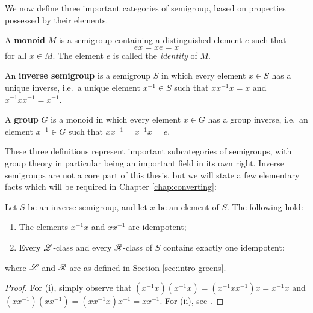 We now define three important categories of semigroup, based on properties
possessed by their elements.

\begin{definition}
  \label{def:monoid}
  A \textbf{monoid} $M$ is a semigroup containing a distinguished element $e$
  such that
  $$ex = xe = x$$
  for all $x \in M$.  The element $e$ is called the \textit{identity} of $M$.
\end{definition}

\begin{definition}
  \label{def:inverse-semigroup}
  An \textbf{inverse semigroup} is a semigroup $S$ in which every element
  $x \in S$ has a unique inverse, i.e.~a unique element $x^{-1} \in S$ such that
  $xx^{-1}x=x$ and $x^{-1}xx^{-1}=x^{-1}$.
\end{definition}

\begin{definition}
  \label{def:group}
  A \textbf{group} $G$ is a monoid in which every element $x \in G$ has a
  group inverse, i.e.~an element $x^{-1} \in G$ such that $xx^{-1}=x^{-1}x = e$.
\end{definition}

These three definitions represent important subcategories of semigroups, with
group theory in particular being an important field in its own right.  Inverse
semigroups are not a core part of this thesis, but we will state a few
elementary facts which will be required in Chapter \ref{chap:converting}:

\begin{proposition}
  \label{prop:inverse-semigroup-facts}
  Let $S$ be an inverse semigroup, and let $x$ be an element of $S$.  The
  following hold:
  \begin{enumerate}[\rm(i)]
  \item The elements $x^{-1}x$ and $xx^{-1}$ are idempotent;
  \item Every $\mathrel{\mathscr{L}}$-class and every $\mathrel{\mathscr{R}}$-class of $S$ contains exactly one
    idempotent;
  \end{enumerate}
  where $\mathrel{\mathscr{L}}$ and $\mathrel{\mathscr{R}}$ are as defined in Section \ref{sec:intro-greens}.
  \begin{proof}
    For (i), simply observe that $(x^{-1}x)(x^{-1}x)=(x^{-1}xx^{-1})x = x^{-1}x$
    and $(xx^{-1})(xx^{-1})=(xx^{-1}x)x^{-1} = xx^{-1}$.  For (ii), see
    \cite[Theorem 5.1.1]{howie}.
  \end{proof}
\end{proposition}


